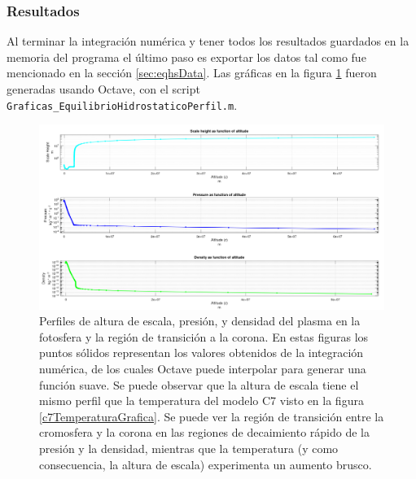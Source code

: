 \subsubsection{Resultados}
Al terminar la integración numérica y tener todos los resultados guardados en la
memoria del programa el último paso es exportar los datos tal como fue
mencionado en la sección \ref{sec:eqhsData}. Las gráficas en la figura
\ref{modeloNumericoResultadosGraficas} fueron generadas usando Octave, con el
script \verb|Graficas_EquilibrioHidrostaticoPerfil.m|. 

\begin{figure}[!ht]
	\centering
	\includegraphics[scale=0.3]{Figuras/IntegracionNumericaGrafica.png}
	\caption{Perfiles de altura de escala, presión, y densidad del plasma en la
	fotosfera y la región de transición a la corona. En estas figuras los puntos
	sólidos representan los valores obtenidos de la integración numérica, de los
	cuales Octave puede interpolar para generar una función suave. Se puede
	observar que la altura de escala tiene el mismo perfil que la temperatura
	del modelo C7 visto en la figura \ref{c7TemperaturaGrafica}. Se puede ver la
	región de transición entre la cromosfera y la corona en las regiones de
	decaimiento rápido de la presión y la densidad, mientras que la temperatura
	(y como consecuencia, la altura de escala) experimenta un aumento brusco.}
	\label{modeloNumericoResultadosGraficas}
\end{figure}